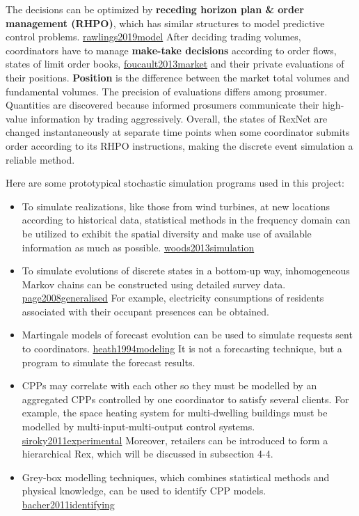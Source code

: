 \documentclass[letterpaper,8pt,twocolumn,twoside,]{pinp}
\providecommand{\tightlist}{%
  \setlength{\itemsep}{0pt}\setlength{\parskip}{0pt}}
\begin{document}
The decisions can be optimized by \textbf{receding horizon plan \& order
management (RHPO)}, which has similar structures to model predictive
control problems. \protect\hyperlink{reference}{rawlings2019model} After
deciding trading volumes, coordinators have to manage \textbf{make-take
decisions} according to order flows, states of limit order books,
\protect\hyperlink{reference}{foucault2013market} and their private
evaluations of their positions. \textbf{Position} is the difference
between the market total volumes and fundamental volumes. The precision
of evaluations differs among prosumer. Quantities are discovered because
informed prosumers communicate their high-value information by trading
aggressively. Overall, the states of RexNet are changed instantaneously
at separate time points when some coordinator submits order according to
its RHPO instructions, making the discrete event simulation a reliable
method.

Here are some prototypical stochastic simulation programs used in this
project:

\begin{itemize}
\tightlist
\item
  To simulate realizations, like those from wind turbines, at new
  locations according to historical data, statistical methods in the
  frequency domain can be utilized to exhibit the spatial diversity and
  make use of available information as much as possible.
  \protect\hyperlink{reference}{woods2013simulation}
\item
  To simulate evolutions of discrete states in a bottom-up way,
  inhomogeneous Markov chains can be constructed using detailed survey
  data. \protect\hyperlink{reference}{page2008generalised} For example,
  electricity consumptions of residents associated with their occupant
  presences can be obtained.
\item
  Martingale models of forecast evolution can be used to simulate
  requests sent to coordinators.
  \protect\hyperlink{reference}{heath1994modeling} It is not a
  forecasting technique, but a program to simulate the forecast results.
\item
  CPPs may correlate with each other so they must be modelled by an
  aggregated CPPs controlled by one coordinator to satisfy several
  clients. For example, the space heating system for multi-dwelling
  buildings must be modelled by multi-input-multi-output control
  systems. \protect\hyperlink{reference}{siroky2011experimental}
  Moreover, retailers can be introduced to form a hierarchical Rex,
  which will be discussed in subsection 4-4.
\item
  Grey-box modelling techniques, which combines statistical methods and
  physical knowledge, can be used to identify CPP models.
  \protect\hyperlink{reference}{bacher2011identifying}
\end{itemize}
\end{document}
